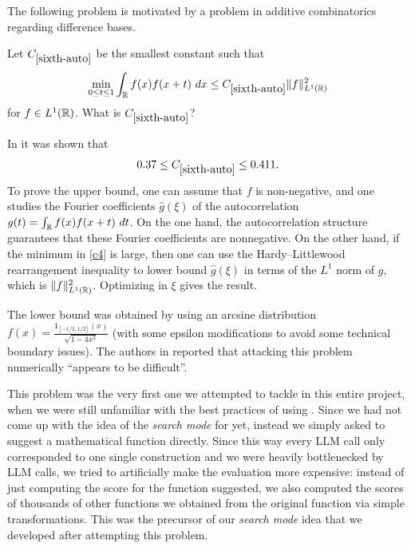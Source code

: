 The following problem is motivated by a problem in additive combinatorics regarding difference bases.

\renewcommand{\problemURL}{https://google-deepmind.github.io/alphaevolve_repository_of_problems/problems/6.html}

\begin{problem}\label{sixth-auto} Let $C_{\ref{sixth-auto}}$ be the smallest constant such that
\begin{equation}\label{c4}
   \min_{0 \leq t \leq 1} \int_{\mathbb{R}} f(x) f(x+t)\ dx \leq C_{\ref{sixth-auto}} \|f\|_{L^1(\mathbb{R})}^2
\end{equation}
for $f \in L^1(\mathbb{R})$.   What is $C_{\ref{sixth-auto}}$?
\end{problem}

In \cite{barnard-steinerberger} it was shown that
$$ 0.37 \leq C_{\ref{sixth-auto}} \leq 0.411.$$
To prove the upper bound, one can assume that $f$ is non-negative, and one studies the Fourier coefficients $\hat g(\xi)$ of the autocorrelation $g(t) = \int_{\mathbb{R}} f(x) f(x+t)\ dt$.  On the one hand, the autocorrelation structure guarantees that these Fourier coefficients are nonnegative.  On the other hand, if the minimum in \eqref{c4} is large, then one can use the Hardy--Littlewood rearrangement inequality to lower bound $\hat g(\xi)$ in terms of the $L^1$ norm of $g$, which is $\|f\|_{L^1(\mathbb{R})}^2$.  Optimizing in $\xi$ gives the result.

The lower bound was obtained by using an arcsine distribution $f(x) = \frac{1_{[-1/2,1/2]}(x)}{\sqrt{1-4x^2}}$ (with some epsilon modifications to avoid some technical boundary issues).  The authors in \cite{barnard-steinerberger} reported that attacking this problem numerically ``appears to be difficult''.

This problem was the very first one we attempted to tackle in this entire project, when we were still unfamiliar with the best practices of using \AlphaEvolve. Since we had not come up with the idea of the \emph{search mode} for \AlphaEvolve yet, instead we simply asked \AlphaEvolve to suggest a mathematical function directly. Since this way every LLM call only corresponded to one single construction and we were heavily bottlenecked by LLM calls, we tried to artificially make the evaluation more expensive: instead of just computing the score for the function \AlphaEvolve suggested, we also computed the scores of thousands of other functions we obtained from the original function via simple transformations. This was the precursor of our \emph{search mode} idea that we developed after attempting this problem.   

